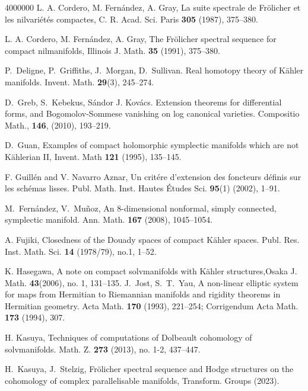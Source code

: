 \documentclass[12pt,reqno]{amsart}
\theoremstyle{definition}
\begin{document}
\begin{thebibliography}{4000000}
 L. A. Cordero, M. Fern\'andez, A. Gray, La suite spectrale de Fr\"olicher et les nilvari\'et\'es compactes, C. R. Acad. Sci. Paris {\bf 305} (1987), 375--380.

 L. A. Cordero, M. Fern\'andez, A. Gray, The Fr\"olicher spectral sequence for compact nilmanifolds, Illinois J. Math. {\bf 35} (1991), 375--380.

		P.~Deligne, P.~Griffiths, J.~Morgan, D.~Sullivan. Real homotopy theory of K\"ahler manifolds. Invent. Math. {\bf29}(3), 245--274.

 D.~Greb, S.~Kebekus, S\'andor J. Kov\'acs. Extension theorems for differential forms, and Bogomolov-Sommese vanishing on log canonical varieties. Compositio Math., {\bf146}, (2010), 193–219.

 D.~Guan, Examples of compact holomorphic symplectic manifolds which are not K\"ahlerian II, Invent. Math {\bf 121} (1995), 135--145.

 F. Guill\'en and V. Navarro Aznar, Un crit\'ere d’extension des
foncteurs d\'efinis sur les sch\'emas lisses. Publ. Math. Inst. Hautes \'Etudes
Sci. {\bf 95}(1) (2002), 1--91.

 M.~Fern\'andez, V.~Mu\~{n}oz, An 8-dimensional nonformal, simply connected, symplectic manifold. Ann. Math. {\bf 167} (2008), 1045--1054.

A. Fujiki, Closedness of the Douady spaces of compact K\"ahler spaces.
Publ. Res. Inst. Math. Sci. {\bf 14} (1978/79), no.1, 1--52.

K. Hasegawa, A note on compact solvmanifolds with Kähler structures,Osaka J. Math. {\bf 43}(2006), no. 1, 131--135.
J.~Jost, S.~T.~Yau, A non-linear elliptic system for maps from Hermitian to Riemannian manifolds and rigidity theorems in Hermitian geometry. Acta Math. {\bf 170} (1993), 221--254; Corrigendum Acta Math. {\bf 173} (1994), 307.

H. Kasuya, Techniques of computations of Dolbeault cohomology of solvmanifolds. Math. Z. {\bf273} (2013), no. 1-2, 437--447.

 H.~Kasuya, J.~Stelzig, Fr\"olicher spectral sequence and Hodge structures on the cohomology of complex parallelisable manifolds, Transform. Groups (2023).


\end{thebibliography}
\end{document}
